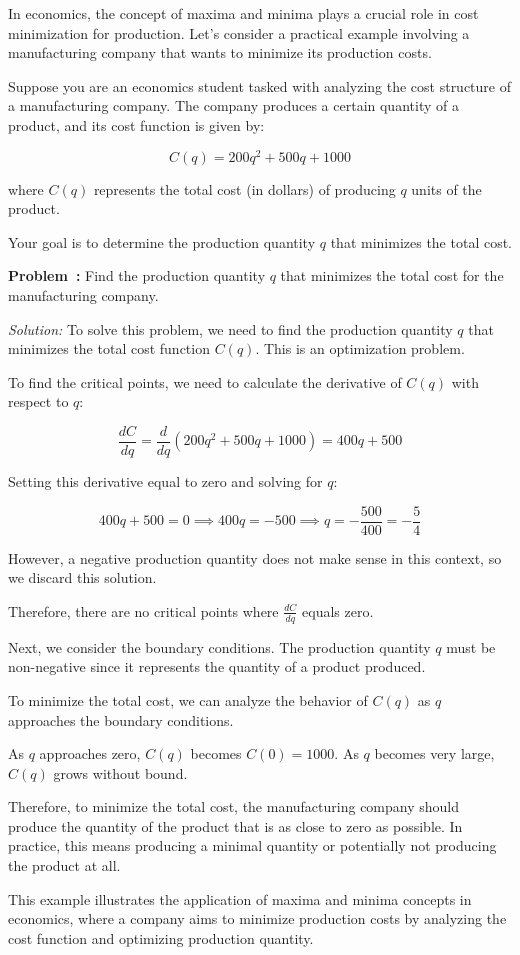 \documentclass[a4paper,12pt]{book}
\newcounter{problem}
\newenvironment{problem}[1][\theproblem]
{\refstepcounter{problem}\par\medskip\noindent\textbf{Problem~#1:} \rmfamily}{\medskip}
\newenvironment{solution}[1][]
{\par\noindent\textit{Solution:} \rmfamily}{\medskip}
\newcounter{example}
\begin{document}
In economics, the concept of maxima and minima plays a crucial role in cost minimization for production. Let's consider a practical example involving a manufacturing company that wants to minimize its production costs.

Suppose you are an economics student tasked with analyzing the cost structure of a manufacturing company. The company produces a certain quantity of a product, and its cost function is given by:

\[
C(q) = 200q^2 + 500q + 1000
\]

where $C(q)$ represents the total cost (in dollars) of producing $q$ units of the product.

Your goal is to determine the production quantity $q$ that minimizes the total cost.

\begin{problem}
Find the production quantity $q$ that minimizes the total cost for the manufacturing company.
\end{problem}

\begin{solution}
To solve this problem, we need to find the production quantity $q$ that minimizes the total cost function $C(q)$. This is an optimization problem.

To find the critical points, we need to calculate the derivative of $C(q)$ with respect to $q$:

\[
\frac{dC}{dq} = \frac{d}{dq}(200q^2 + 500q + 1000) = 400q + 500
\]

Setting this derivative equal to zero and solving for $q$:

\[
400q + 500 = 0 \implies 400q = -500 \implies q = -\frac{500}{400} = -\frac{5}{4}
\]

However, a negative production quantity does not make sense in this context, so we discard this solution.

Therefore, there are no critical points where $\frac{dC}{dq}$ equals zero.

Next, we consider the boundary conditions. The production quantity $q$ must be non-negative since it represents the quantity of a product produced.

To minimize the total cost, we can analyze the behavior of $C(q)$ as $q$ approaches the boundary conditions.

As $q$ approaches zero, $C(q)$ becomes $C(0) = 1000$. As $q$ becomes very large, $C(q)$ grows without bound.

Therefore, to minimize the total cost, the manufacturing company should produce the quantity of the product that is as close to zero as possible. In practice, this means producing a minimal quantity or potentially not producing the product at all.

This example illustrates the application of maxima and minima concepts in economics, where a company aims to minimize production costs by analyzing the cost function and optimizing production quantity.
\end{solution}
\end{document}
